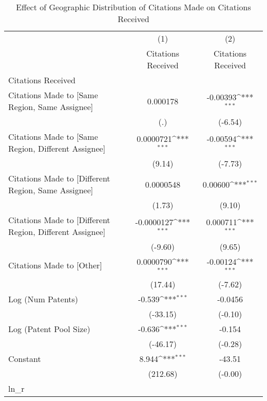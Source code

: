 {
\def\sym#1{\ifmmode^{#1}\else\(^{#1}\)\fi}
\begin{longtable}{l*{2}{c}}
\caption{Effect of Geographic Distribution of Citations Made on Citations Received \label{eflowsreg}}\\
\hline\hline\endfirsthead\hline\endhead\hline\endfoot\endlastfoot
                    &\multicolumn{1}{c}{(1)}&\multicolumn{1}{c}{(2)}\\
                    &\multicolumn{1}{c}{Citations Received}&\multicolumn{1}{c}{Citations Received}\\
\hline
Citations Received  &                     &                     \\
Citations Made to [Same Region, Same Assignee]&    0.000178         &    -0.00393\sym{***}\\
                    &         (.)         &     (-6.54)         \\
[1em]
Citations Made to [Same Region, Different Assignee]&   0.0000721\sym{***}&    -0.00594\sym{***}\\
                    &      (9.14)         &     (-7.73)         \\
[1em]
Citations Made to [Different Region, Same Assignee]&   0.0000548         &     0.00600\sym{***}\\
                    &      (1.73)         &      (9.10)         \\
[1em]
Citations Made to [Different Region, Different Assignee]&  -0.0000127\sym{***}&    0.000711\sym{***}\\
                    &     (-9.60)         &      (9.65)         \\
[1em]
Citations Made to [Other]&   0.0000790\sym{***}&    -0.00124\sym{***}\\
                    &     (17.44)         &     (-7.62)         \\
[1em]
Log (Num Patents)   &      -0.539\sym{***}&     -0.0456         \\
                    &    (-33.15)         &     (-0.10)         \\
[1em]
Log (Patent Pool Size)&      -0.636\sym{***}&      -0.154         \\
                    &    (-46.17)         &     (-0.28)         \\
[1em]
Constant            &       8.944\sym{***}&      -43.51         \\
                    &    (212.68)         &     (-0.00)         \\
\hline
ln\_r                &                     &                     \\

\end{longtable}}
